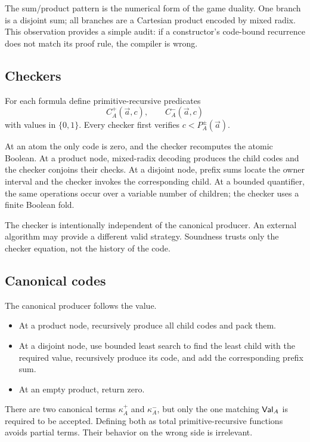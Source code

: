 The sum/product pattern is the numerical form of the game duality.  One branch
is a disjoint sum; all branches are a Cartesian product encoded by mixed radix.
This observation provides a simple audit: if a constructor's code-bound
recurrence does not match its proof rule, the compiler is wrong.

\subsection{Checkers}

For each formula define primitive-recursive predicates
\[
 C_A^+(\vec a,c),\qquad C_A^-(\vec a,c)
\]
with values in \(\{0,1\}\).  Every checker first verifies
\(c<P_A^\pm(\vec a)\).

At an atom the only code is zero, and the checker recomputes the atomic Boolean.
At a product node, mixed-radix decoding produces the child codes and the
checker conjoins their checks.  At a disjoint node, prefix sums locate the owner
interval and the checker invokes the corresponding child.  At a bounded
quantifier, the same operations occur over a variable number of children;
the checker uses a finite Boolean fold.

The checker is intentionally independent of the canonical producer.  An
external algorithm may provide a different valid strategy.  Soundness trusts
only the checker equation, not the history of the code.

\subsection{Canonical codes}

The canonical producer follows the value.

\begin{itemize}
\item At a product node, recursively produce all child codes and pack them.
\item At a disjoint node, use bounded least search to find the least child with
the required value, recursively produce its code, and add the corresponding
prefix sum.
\item At an empty product, return zero.
\end{itemize}

There are two canonical terms \(\kappa_A^+\) and \(\kappa_A^-\), but only the
one matching \(\mathsf{Val}_A\) is required to be accepted.  Defining both as total
primitive-recursive functions avoids partial terms.  Their behavior on the
wrong side is irrelevant.

